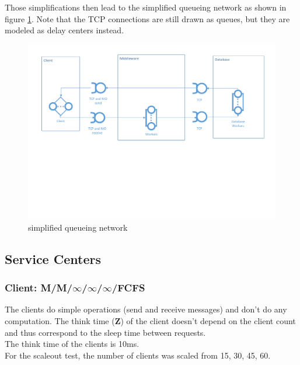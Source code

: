 \documentclass[a4paper]{article}
\begin{document}
{\noindent Those simplifications then lead to the simplified queueing network as shown in figure \ref{fig:simplified-queueing-network}. Note that the TCP connections are still drawn as queues, but they are modeled as delay centers instead.\\


\begin{figure}[H]
	\begin{center}
    \includegraphics[scale=0.6, trim = 15mm 94mm 12mm 10mm, clip]{../drawings-ms2le/simplified-queueing-network.pdf}
  \end{center}
  \caption{simplified queueing network}
  \label{fig:simplified-queueing-network}
\end{figure}

\subsection{Service Centers}

\subsubsection{Client: M/M/$\infty$/$\infty$/$\infty$/FCFS}

The clients do simple operations (send and receive messages) and don't do any computation. The think time (\textbf{Z}) of the client doesn't depend on the client count and thus correspond to the sleep time between requests.\\

\noindent The think time of the clients is 10ms.\\

For the scaleout test, the number of clients was scaled from 15, 30, 45, 60.

}
\end{document}
